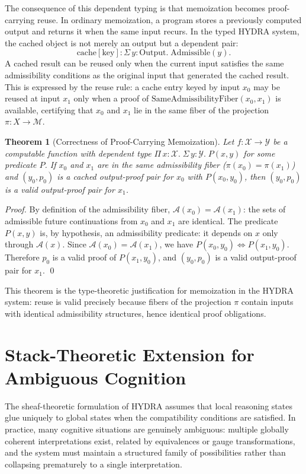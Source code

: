\documentclass[12pt, a4paper, openany]{book}
\theoremstyle{plain}
\newtheorem{theorem}{Theorem}[chapter]
\theoremstyle{definition}
\theoremstyle{remark}
\newcommand{\Adm}{\mathcal{A}}
\begin{document}
The consequence of this dependent typing is that memoization becomes proof-carrying reuse. In ordinary memoization, a program stores a previously computed output and returns it when the same input recurs. In the typed HYDRA system, the cached object is not merely an output but a dependent pair:
\[
\mathrm{cache}[\mathrm{key}] : \Sigma\, y : \mathrm{Output}.\; \mathrm{Admissible}(y).
\]
A cached result can be reused only when the current input satisfies the same admissibility conditions as the original input that generated the cached result. This is expressed by the reuse rule: a cache entry keyed by input $x_0$ may be reused at input $x_1$ only when a proof of $\mathrm{SameAdmissibilityFiber}(x_0, x_1)$ is available, certifying that $x_0$ and $x_1$ lie in the same fiber of the projection $\pi: X \to \mathcal{M}$.

\begin{theorem}[Correctness of Proof-Carrying Memoization]
Let $f: \mathcal{X} \to \mathcal{Y}$ be a computable function with dependent type $\Pi\, x : \mathcal{X}.\; \Sigma\, y : \mathcal{Y}.\; P(x, y)$ for some predicate $P$. If $x_0$ and $x_1$ are in the same admissibility fiber ($\pi(x_0) = \pi(x_1)$) and $(y_0, p_0)$ is a cached output-proof pair for $x_0$ with $P(x_0, y_0)$, then $(y_0, p_0)$ is a valid output-proof pair for $x_1$.
\end{theorem}

\begin{proof}
By definition of the admissibility fiber, $\Adm(x_0) = \Adm(x_1)$: the sets of admissible future continuations from $x_0$ and $x_1$ are identical. The predicate $P(x, y)$ is, by hypothesis, an admissibility predicate: it depends on $x$ only through $\Adm(x)$. Since $\Adm(x_0) = \Adm(x_1)$, we have $P(x_0, y_0) \iff P(x_1, y_0)$. Therefore $p_0$ is a valid proof of $P(x_1, y_0)$, and $(y_0, p_0)$ is a valid output-proof pair for $x_1$. \qed
\end{proof}

This theorem is the type-theoretic justification for memoization in the HYDRA system: reuse is valid precisely because fibers of the projection $\pi$ contain inputs with identical admissibility structures, hence identical proof obligations.

\section{Stack-Theoretic Extension for Ambiguous Cognition}

The sheaf-theoretic formulation of HYDRA assumes that local reasoning states glue uniquely to global states when the compatibility conditions are satisfied. In practice, many cognitive situations are genuinely ambiguous: multiple globally coherent interpretations exist, related by equivalences or gauge transformations, and the system must maintain a structured family of possibilities rather than collapsing prematurely to a single interpretation.
\end{document}

